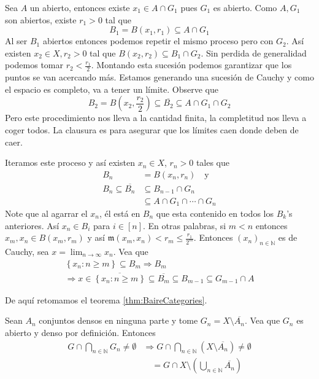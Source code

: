 \documentclass[12pt]{article}
\theoremstyle{plain}
\theoremstyle{definition}
\theoremstyle{remark}
\numberwithin{equation}{section}
\newcommand{\bN}{\mathbb{N}}        %
\newcommand{\mm}{\mathfrak{m}}      %
\renewcommand{\geq}{\geqslant}      %
\renewcommand{\leq}{\leqslant}      %
\renewcommand{\:}{\colon}           %
\newcommand{\conj}[1]{\left\lbrace#1\right\rbrace}
\newcommand{\bonj}[1]{\left\lbrack#1\right\rbrack}
\begin{document}
\begin{multicols}{2}
\begin{ptcbp}
Sea $A$ un abierto, entonces existe $x_1\in A\cap G_1$ pues $G_1$ es abierto. Como $A,G_1$ son abiertos, existe $r_1>0$ tal que
$$B_1=B(x_1,r_1)\subseteq A\cap G_1$$
Al ser $B_1$ abiertos entonces podemos repetir el mismo proceso pero con $G_2$. Así existen $x_2\in X,r_2>0$ tal que $B(x_2,r_2)\subseteq B_1\cap G_2$. Sin perdida de generalidad podemos tomar $r_2<\frac{r_1}{2}$. Montando esta sucesión podemos garantizar que los puntos se van acercando más. Estamos generando una sucesión de Cauchy y como el espacio es completo, va a tener un límite.
Observe que
$$B_2=B(x_2,\frac{r_2}{2})\subseteq \overline{B_2}\subseteq A\cap G_1\cap G_2$$
Pero este procedimiento nos lleva a la cantidad finita, la completitud nos lleva a coger todos. La clausura es para asegurar que los límites caen donde deben de caer.\par
Iteramos este proceso y así existen $x_n\in X$, $r_n>0$ tales que
\begin{align*}
  B_n &=B(x_n,r_n)\quad\text{y} \\
  B_n\subseteq\overline{B_n} &\subseteq B_{n-1}\cap G_n \\
   &\subseteq A\cap G_1\cap\cdots\cap G_n
\end{align*}
Note que al agarrar el $x_n$, él está en $B_n$ que esta contenido en todos los $B_k$'s anteriores. Así $x_n\in B_i$ para $i\in\bonj{n}$. En otras palabras, si $m<n$ entonces $x_m,x_n\in B(x_m,r_m)$ y así $\mm(x_m,x_n)<r_m\leq\frac{r_1}{2^m}$. Entonces $(x_n)_{n\in\bN}$ es de Cauchy, sea $x=\lim_{n\to\infty}x_n$. Vea que
\begin{gather*}
  \conj{x_n\colon n\geq m}\subseteq B_m\Rightarrow B_m \\
  \Rightarrow x\in\overline{\conj{x_n\colon n\geq m}}\subseteq\overline{B_m}\subseteq B_{m-1}\subseteq G_{m-1}\cap A
\end{gather*}

\end{ptcbp}

De aquí retomamos el teorema \ref{thm:BaireCategories}.

\begin{ptcbp}
Sean $A_n$ conjuntos densos en ninguna parte y tome $G_n=X\setminus\overline{A_n}$. Vea que $G_n$ es abierto y denso por definición. Entonces
\begin{align*}
  G\cap\bigcap_{n\in\bN}G_n\neq \emptyset &\Rightarrow G\cap\bigcap_{n\in\bN}(X\setminus\overline{A_n})\neq \emptyset\\
   &\quad=G\cap X\setminus(\bigcup_{n\in\bN}\overline{A_n})
\end{align*}
\end{ptcbp}


\end{multicols}
\end{document}
